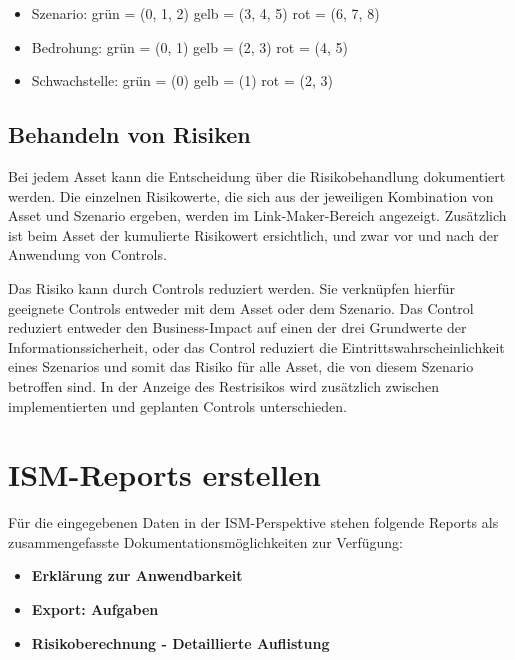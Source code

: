 \documentclass[a4paper,10pt]{book}
\begin{document}
\begin{itemize}
 \item Szenario:
 \subitem grün = (0, 1, 2)
 \subitem gelb = (3, 4, 5)
 \subitem rot = (6, 7, 8)
\end{itemize}

\begin{itemize}
 \item Bedrohung:
 \subitem grün = (0, 1)
 \subitem gelb = (2, 3)
 \subitem rot = (4, 5)
\end{itemize}

\begin{itemize}
 \item Schwachstelle:
 \subitem grün = (0)
 \subitem gelb = (1)
 \subitem rot = (2, 3)
\end{itemize}


\subsection{Behandeln von Risiken}
Bei jedem Asset kann die Entscheidung über die Risikobehandlung dokumentiert
werden. Die einzelnen Risikowerte, die sich aus der jeweiligen Kombination von
Asset und Szenario ergeben, werden im Link-Maker-Bereich angezeigt. Zusätzlich
ist beim Asset der kumulierte Risikowert ersichtlich, und zwar vor und nach der
Anwendung von Controls.

Das Risiko kann durch Controls reduziert werden. Sie verknüpfen hierfür
geeignete Controls entweder mit dem Asset oder dem Szenario. Das Control
reduziert entweder den Business-Impact auf einen der drei Grundwerte der
Informationssicherheit, oder das Control reduziert die
Eintrittswahrscheinlichkeit eines Szenarios und somit das Risiko für alle Asset,
die von diesem Szenario betroffen sind. In der Anzeige des Restrisikos wird
zusätzlich zwischen implementierten und geplanten Controls unterschieden.

\section{ISM-Reports erstellen}
\label{ISM-Reports erstellen}

Für die eingegebenen Daten in der ISM-Perspektive stehen folgende Reports als
zusammengefasste Dokumentationsmöglichkeiten zur Verfügung:

\begin{itemize}
\item \textbf{Erklärung zur Anwendbarkeit}
\item \textbf{Export: Aufgaben}
\item \textbf{Risikoberechnung - Detaillierte Auflistung}
\end{itemize}
\end{document}
